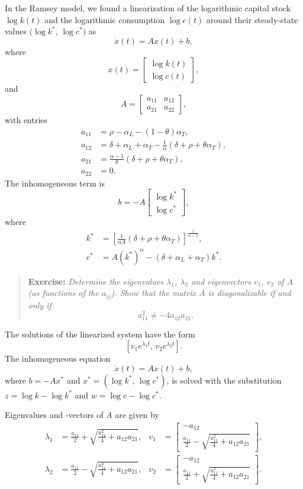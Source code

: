 \documentclass[10pt]{article}
\begin{document}
In the Ramsey model, we found a linearization of the logarithmic capital stock $\log k(t)$ and the logarithmic consumption $\log c(t)$ around their steady-state values $(\log k^*$, $\log c^*)$ as
\[
\dot{x}(t) = A x(t) + b,
\]
where
\[
x(t) = \left[\begin{array}{c}\log k(t) \\ \log c(t)\end{array}\right],
\]
and
\[
A = \left[\begin{array}{cc}
a_{11} & a_{12} \\
a_{21} & a_{22}
\end{array}\right],
\]
with entries
\begin{align*}
a_{11} &= \rho - \alpha_L - (1-\theta) \alpha_T,\\
a_{12} &= \delta + \alpha_L + \alpha_T - \frac{1}{\alpha}(\delta + \rho + \theta\alpha_T),\\
a_{21} &= \frac{\alpha -1}{\theta} (\delta + \rho + \theta\alpha_T),\\
a_{22} &= 0.
\end{align*}
The inhomogeneous term is
\[
b = -A \left[\begin{array}{c} \log k^* \\ \log c^* \end{array}\right],
\]
where
\begin{align*}
k^* &= \left[  \frac{1}{\alpha A} (\delta + \rho + \theta\alpha_T)  \right]^{\frac{1}{\alpha -1}},\\
c^* &= A (k^*)^\alpha - (\delta + \alpha_L + \alpha_T) k^*.
\end{align*}

\begin{quote}
\textbf{Exercise:} \textit{Determine the eigenvalues $\lambda_{1}$, $\lambda_2$ and eigenvectors $v_{1}$, $v_2$ of $A$ (as functions of the $a_{ij}$).  Show that the matrix $A$ is diagonalizable if and only if}
\[
a_{11}^2 \neq -4 a_{12}a_{21}.
\]
\end{quote}

The solutions of the linearized system have the form
\[
[v_1 e^{\lambda_1 t},\, v_2 e^{\lambda_2 t}  ].
\]
The inhomogeneous equation 
\[
\dot{x}(t) = A x(t) + b,
\]
where $b = - A x^*$ and $x^*=(\log k^*,\, \log c^*)$, is solved with the substitution $z= \log k -\log k^*$ and $w= \log c -\log c^*$.


Eigenvalues and -vectors of $A$ are given by
\begin{align*}
\lambda_1 &= \frac{a_{11}}{2} + \sqrt{\frac{a_{11}^2}{4} + a_{12}a_{21}}, & v_1 &= \left[\begin{array}{c} -a_{12} \\ \frac{a_{11}}{2} - \sqrt{\frac{a_{11}^2}{4} + a_{12}a_{21}} \end{array}\right],\\
\lambda_2 &= \frac{a_{11}}{2} - \sqrt{\frac{a_{11}^2}{4} + a_{12}a_{21}}, & v_2 &= \left[\begin{array}{c} -a_{12} \\ \frac{a_{11}}{2} + \sqrt{\frac{a_{11}^2}{4} + a_{12}a_{21}} \end{array}\right].
\end{align*}
\end{document}
